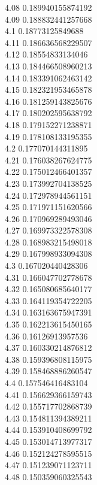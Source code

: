 {4.08	0.189940155874192\\
4.09	0.188832441257668\\
4.1	0.18773125849688\\
4.11	0.186636568229507\\
4.12	0.18554833134046\\
4.13	0.184466508960213\\
4.14	0.183391062463142\\
4.15	0.182321953465878\\
4.16	0.181259143825676\\
4.17	0.180202595638792\\
4.18	0.179152271238871\\
4.19	0.178108133195355\\
4.2	0.177070144311895\\
4.21	0.176038267624775\\
4.22	0.175012466401357\\
4.23	0.173992704138525\\
4.24	0.172978944561151\\
4.25	0.171971151620566\\
4.26	0.170969289493046\\
4.27	0.169973322578308\\
4.28	0.168983215498018\\
4.29	0.167998933094308\\
4.3	0.167020440428306\\
4.31	0.166047702778678\\
4.32	0.165080685640177\\
4.33	0.164119354722205\\
4.34	0.163163675947391\\
4.35	0.162213615450165\\
4.36	0.16126913957536\\
4.37	0.160330214876812\\
4.38	0.159396808115975\\
4.39	0.158468886260547\\
4.4	0.157546416483104\\
4.41	0.156629366159743\\
4.42	0.155717702868739\\
4.43	0.154811394389211\\
4.44	0.153910408699792\\
4.45	0.153014713977317\\
4.46	0.152124278595515\\
4.47	0.151239071123711\\
4.48	0.150359060325543\\
}
